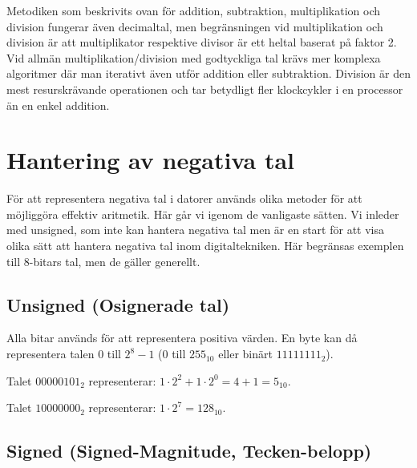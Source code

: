 \documentclass[
  swedish,
  letterpaper,
  oneside,
  openany]{book}
\begin{document}
Metodiken som beskrivits ovan för addition, subtraktion, multiplikation
och division fungerar även decimaltal, men begränsningen vid
multiplikation och division är att multiplikator respektive divisor är
ett heltal baserat på faktor 2. Vid allmän multiplikation/division med
godtyckliga tal krävs mer komplexa algoritmer där man iterativt även
utför addition eller subtraktion. Division är den mest resurskrävande
operationen och tar betydligt fler klockcykler i en processor än en
enkel addition.

\section{Hantering av negativa tal}\label{hantering-av-negativa-tal}

För att representera negativa tal i datorer används olika metoder för
att möjliggöra effektiv aritmetik. Här går vi igenom de vanligaste
sätten. Vi inleder med unsigned, som inte kan hantera negativa tal men
är en start för att visa olika sätt att hantera negativa tal inom
digitaltekniken. Här begränsas exemplen till 8-bitars tal, men de gäller
generellt.

\subsection{Unsigned (Osignerade tal)}\label{unsigned-osignerade-tal}

Alla bitar används för att representera positiva värden. En byte kan då
representera talen \(0\) till \(2^8 - 1\) (\(0\) till \(255_{10}\) eller
binärt \(11111111_2\)).

\begin{tcolorbox}[enhanced jigsaw, arc=.35mm, bottomrule=.15mm, bottomtitle=1mm, breakable, colback=white, colbacktitle=quarto-callout-note-color!10!white, colframe=quarto-callout-note-color-frame, coltitle=black, left=2mm, leftrule=.75mm, opacityback=0, opacitybacktitle=0.6, rightrule=.15mm, title=\textcolor{quarto-callout-note-color}{\faInfo}\hspace{0.5em}{Exempel: 8-bitars unsigned}, titlerule=0mm, toprule=.15mm, toptitle=1mm]

Talet \(00000101_2\) representerar:
\(1 \cdot 2^2 + 1 \cdot 2^0 = 4 + 1 = 5_{10}\).

Talet \(10000000_2\) representerar: \(1 \cdot 2^7 = 128_{10}\).

\end{tcolorbox}

\subsection{Signed (Signed-Magnitude,
Tecken-belopp)}\label{signed-signed-magnitude-tecken-belopp}
\end{document}
